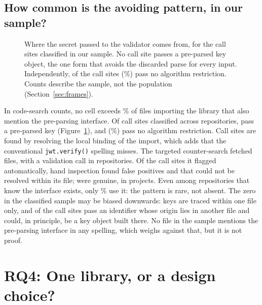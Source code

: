 \documentclass[preprint,12pt,authoryear]{elsarticle}
\begin{document}
\subsection{How common is the avoiding pattern, in our sample?}\label{sec:prevalence}

\begin{figure}[!t]
\centering

\caption{Where the secret passed to the validator comes from, for the
\SampleCallSites{} call sites classified in our sample. No call site passes a
pre-parsed key object, the one form that avoids the discarded parse for every
input. Independently, \SampleNoAlgorithms{} of the \SampleCallSites{} call
sites (\SampleNoAlgorithmsPct\%) pass no algorithm restriction. Counts
describe the sample, not the population (Section~\ref{sec:frames}).}
\label{fig:survey}
\end{figure}

In code-search counts, no cell exceeds \PopWorstCellPct\% of files importing
the library that also mention the pre-parsing interface. Of \SampleCallSites{}
call sites classified across \SampleRepos{} repositories, \SampleSitesPreparsed{}
pass a pre-parsed key (Figure~\ref{fig:survey}), and \SampleNoAlgorithms{}
(\SampleNoAlgorithmsPct\%) pass no algorithm restriction. Call sites are found by
resolving the local binding of the import, which adds \SampleRematchAdded{} that
the conventional \texttt{jwt.verify()} spelling misses. The targeted
counter-search fetched \CounterFilesFetched{} files, \CounterWithVerify{} with a
validation call in \CounterReposWithVerify{} repositories. Of the
\AdjudicatedTotal{} call sites it flagged automatically, hand inspection found
\AdjudicatedFalsePositive{} false positives and \AdjudicatedUnresolved{} that
could not be resolved within its file; \AdjudicatedGenuine{} were genuine, in
\AdjudicatedGenuineProjects{} projects. Even among repositories that know the
interface exists, only \AdjudicatedGenuinePct\% use it: the pattern is rare, not
absent. The zero in the classified sample may be biased downwards: keys are
traced within one file only, and \SampleUnknown{} of the \SampleCallSites{}
call sites pass an identifier whose origin lies in another file and could, in
principle, be a key object built there. No file in the sample mentions the
pre-parsing interface in any spelling, which weighs against that, but it is not
proof.

\section{RQ4: One library, or a design choice?}\label{sec:rq4}
\end{document}
